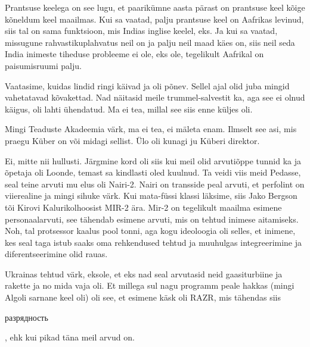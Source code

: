 
Prantsuse keelega on see lugu, et paarikümne aasta pärast on prantsuse keel kõige kõneldum keel maailmas. Kui sa vaatad, palju prantsuse keel on Aafrikas levinud, siis tal on sama funktsioon, mis Indias inglise keelel, eks. Ja kui sa vaatad, missugune  rahvastikuplahvatus neil on ja palju neil maad käes on, siis neil seda India inimeste tiheduse probleeme ei ole, eks ole, tegelikult  Aafrikal on  paisumisruumi palju.
                 

Vaatasime, kuidas lindid ringi käivad ja oli põnev. Sellel ajal olid juba mingid vahetatavad kõvakettad. Nad näitasid meile trummel-salvestit ka, aga see ei olnud käigus, oli lahti ühendatud. Ma ei tea, millal see siis enne küljes oli. 


Mingi Teaduste Akadeemia värk, ma ei tea, ei mäleta enam. Ilmselt see asi, mis praegu Küber on või midagi sellist. Ülo oli kunagi ju Küberi direktor.


Ei, mitte nii hullusti. Järgmine kord oli siis kui meil olid arvutiõppe tunnid ka ja õpetaja oli Loonde, temast sa kindlasti oled kuulnud. Ta veidi viis meid Pedasse, seal teine arvuti mu elus oli Nairi-2. Nairi on transside peal arvuti, et perfolint on viierealine ja mingi sihuke värk. Kui mata-füssi klassi läksime, siis Jako Bergson tõi Kirovi Kalurikolhoosist MIR-2 ära. Mir-2 on tegelikult maailma esimene personaalarvuti, see tähendab esimene arvuti, mis on tehtud inimese aitamiseks. Noh, tal protsessor kaalus pool tonni, aga kogu ideoloogia oli selles, et inimene, kes seal  taga istub saaks oma rehkendused tehtud ja muuhulgas integreerimine ja diferentseerimine olid rauas.

                 
Ukrainas tehtud värk, eksole, et eks nad seal arvutasid neid gaasiturbiine ja rakette ja no mida vaja oli. Et millega sul nagu programm peale hakkas (mingi Algoli sarnane keel oli) oli see, et esimene käsk oli RAZR, mis tähendas siis \begin{russian}разрядность\end{russian}, ehk kui pikad täna meil arvud on.

